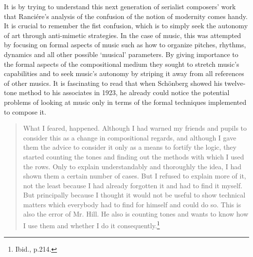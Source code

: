 It is by trying to understand this next generation of serialist composers' work that Ranci\'{e}re's analysis of the confusion of the notion of modernity comes handy. It is crucial to remember the fist confusion, which is to simply seek the autonomy of art through anti-mimetic strategies. In the case of music, this was attempted by focusing on formal aspects of music such as how to organize pitches, rhythms, dynamics and all other possible `musical' parameters. By giving importance to the formal aspects of the compositional medium they sought to stretch music's capabilities and to seek music's autonomy by striping it away from all references of other musics. It is fascinating to read that when Sch\"{o}nberg showed his twelve-tone method to his associates in 1923, he already could notice the potential problems of looking at music only in terms of the formal techniques implemented to compose it. 
\begin{quote}
What I feared, happened. Although I had warned my friends and pupils to consider this as a change in compositional regards, and although I gave them the advice to consider it only as a means to fortify the logic, they started counting the tones and finding out the methods with which I used the rows. Only to explain understandably and thoroughly the idea, I had shown them a certain number of cases. But I refused to explain more of it, not the least because I had already forgotten it and had to find it myself. But principally because I thought it would not be useful to show technical matters which everybody had to find for himself and could do so. This is also the error of Mr. Hill. He also is counting tones and wants to know how I use them and whether I do it consequently.\footnote{Ibid., p.214.} 
\end{quote}


